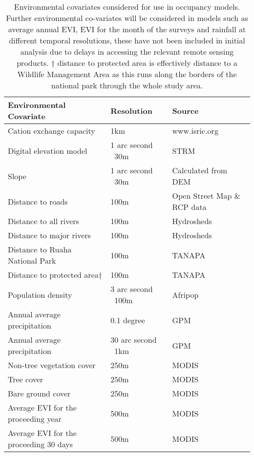 \begin{table}[h]
	\small
	\begin{center}
		\begin{tabular}{l p{3cm} p{7cm}}
			\hline \hline		
			Environmental Covariate	        		    & Resolution	 			& Source\\ \hline
			Cation exchange capacity	            	& 1km						& www.isric.org\\
			Digital elevation model	    		        & 1 arc second ~30m			& STRM\\
			Slope		        				    	& 1 arc second ~30m			& Calculated from DEM\\
			Distance to roads	        	    		& 100m						& Open Street Map \& RCP data\\
			Distance to all rivers		        	    & 100m						& Hydrosheds\\
			Distance to major rivers	        	    & 100m						& Hydrosheds\\
			Distance to Ruaha National Park	            & 100m						& TANAPA\\
			Distance to protected area$\dagger$	        & 100m						& TANAPA\\
			Population density				            & 3 arc second ~100m		& Afripop\\
			Annual average precipitation    		    & 0.1 degree        		& GPM\\
			Annual average precipitation    		    & 30 arc second ~1km		& GPM\\
			Non-tree vegetation cover   	        	& 250m						& MODIS\\			
			Tree cover					            	& 250m						& MODIS\\			
			Bare ground cover			            	& 250m						& MODIS\\			
			Average EVI for the proceeding year         & 500m						& MODIS\\			
			Average EVI for the proceeding 30 days      & 500m						& MODIS\\			
			\hline \hline						
		\end{tabular}
		\caption{Environmental covariates considered for use in occupancy models. Further environmental co-variates will be considered in models such as average annual EVI, EVI for the month of the surveys and rainfall at different temporal resolutions, these have not been included in initial analysis due to delays in accessing the relevant remote sensing products. $\dagger$ distance to protected area is effectively distance to a Wildlife Management Area as this runs along the borders of the national park through the whole study area.}
	\label{table:env_covariates}
	\end{center}
\end{table}

